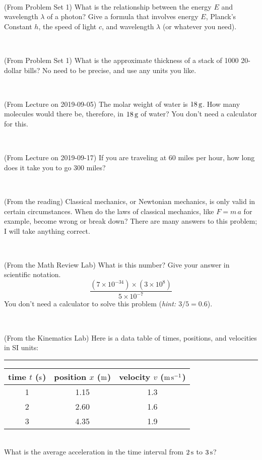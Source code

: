 \documentclass[12pt, letterpaper]{article}
\begin{document}
\vfill ~

\begin{problem} (From Problem Set 1)
What is the relationship between the energy $E$ and wavelength
$\lambda$ of a photon? Give a formula that involves energy $E$,
Planck's Constant $h$, the speed of light $c$, and wavelength
$\lambda$ (or whatever you need).
\end{problem}

\vfill ~

\begin{problem} (From Problem Set 1)
What is the approximate thickness of a stack of 1000 20-dollar bills?
No need to be precise, and use any units you like.
\end{problem}


\vfill ~

\begin{problem} (From Lecture on 2019-09-05)
The molar weight of water is $18\,\mathrm{g}$. How many molecules would there
be, therefore, in $18\,\mathrm{g}$ of water? You don't need a calculator for
this.
\end{problem}


\vfill ~


\clearpage


\begin{problem} (From Lecture on 2019-09-17)
If you are traveling at 60 miles per hour, how long does
it take you to go 300 miles?
\end{problem}


\vfill ~

\begin{problem} (From the reading)
Classical mechanics, or Newtonian mechanics, is only valid in certain
circumstances. When do the laws of classical mechanics, like $F =
m\,a$ for example, become wrong or break down? There are many answers
to this problem; I will take anything correct.
\end{problem}


\vfill ~

\begin{problem} (From the Math Review Lab)
What is this number? Give your answer in scientific notation.
$$
\frac{(7\times10^{-34})\times(3\times10^8)}{5\times10^{-7}}
$$
You don't need a calculator to solve this problem (\textit{hint: $3/5=0.6$}).
\end{problem}


\vfill ~

\begin{problem} (From the Kinematics Lab)
Here is a data table of times, positions, and velocities in SI units:\\
\rule{1.0in}{0pt}\begin{tabular}{c|c|c}
time $t$ ($\mathrm{s}$) & position $x$ ($\mathrm{m}$) & velocity $v$ ($\mathrm{m}\,\mathrm{s}^{-1}$) \\
\hline
1 & 1.15 & 1.3 \\
2 & 2.60 & 1.6 \\
3 & 4.35 & 1.9 \\
\hline
\end{tabular}\\
What is the average acceleration in the time interval from $2\,\mathrm{s}$ to $3\,\mathrm{s}$?
\end{problem}
\end{document}
